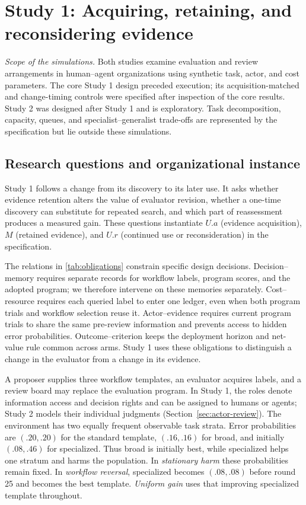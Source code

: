 \section{Study 1: Acquiring, retaining, and reconsidering evidence}
\label{sec:study}
\emph{Scope of the simulations.} Both studies examine evaluation and review arrangements in human--agent organizations using synthetic task, actor, and cost parameters. The core Study 1 design preceded execution; its acquisition-matched and change-timing controls were specified after inspection of the core results. Study 2 was designed after Study 1 and is exploratory. Task decomposition, capacity, queues, and specialist--generalist trade-offs are represented by the specification but lie outside these simulations.

\subsection{Research questions and organizational instance}
Study 1 follows a change from its discovery to its later use. It asks whether evidence retention alters the value of evaluator revision, whether a one-time discovery can substitute for repeated search, and which part of reassessment produces a measured gain. These questions instantiate $U.a$ (evidence acquisition), $M$ (retained evidence), and $U.r$ (continued use or reconsideration) in the specification.

The relations in \cref{tab:obligations} constrain specific design decisions. Decision--memory requires separate records for workflow labels, program scores, and the adopted program; we therefore intervene on these memories separately. Cost--resource requires each queried label to enter one ledger, even when both program trials and workflow selection reuse it. Actor--evidence requires current program trials to share the same pre-review information and prevents access to hidden error probabilities. Outcome--criterion keeps the deployment horizon and net-value rule common across arms. Study 1 uses these obligations to distinguish a change in the evaluator from a change in its evidence.

A proposer supplies three workflow templates, an evaluator acquires labels, and a review board may replace the evaluation program. In Study 1, the roles denote information access and decision rights and can be assigned to humans or agents; Study 2 models their individual judgments (Section~\ref{sec:actor-review}). The environment has two equally frequent observable task strata. Error probabilities are $(.20,.20)$ for the standard template, $(.16,.16)$ for broad, and initially $(.08,.46)$ for specialized. Thus broad is initially best, while specialized helps one stratum and harms the population. In \emph{stationary harm} these probabilities remain fixed. In \emph{workflow reversal}, specialized becomes $(.08,.08)$ before round 25 and becomes the best template. \emph{Uniform gain} uses that improving specialized template throughout.


